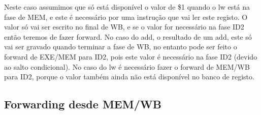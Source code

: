\documentclass[pdftex,12pt,a4paper]{report}
\begin{document}
\begin{table}[!htb]
\centering
\label{my-label}
\end{table}

Neste caso assumimos que só está disponível o valor de \$1 quando o lw está na fase de MEM, e este é necessário por uma instrução que vai ler este registo. O valor só vai ser escrito no final de WB, e se o valor for necessário na fase ID2 então teremos de fazer forward. No caso do add, o resultado de um add, este só vai ser gravado quando terminar a fase de WB, no entanto pode ser feito o forward de EXE/MEM para ID2, pois este valor é necessário na fase ID2 (devido ao salto condicional). No caso do lw é necessário fazer o forward de MEM/WB para ID2, porque o valor também ainda não está disponível no banco de registo.

\subsection{Forwarding desde MEM/WB}
\end{document}
